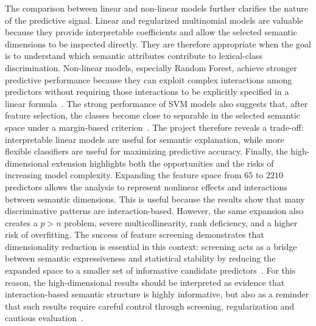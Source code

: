\documentclass{ipgpmaster}
\begin{document}
The comparison between linear and non-linear models further clarifies the nature of the predictive signal. Linear and regularized multinomial models are valuable because they provide interpretable coefficients and allow the selected semantic dimensions to be inspected directly. They are therefore appropriate when the goal is to understand which semantic attributes contribute to lexical-class discrimination. Non-linear models, especially Random Forest, achieve stronger predictive performance because they can exploit complex interactions among predictors without requiring those interactions to be explicitly specified in a linear formula~\cite{breiman2001random}. The strong performance of SVM models also suggests that, after feature selection, the classes become close to separable in the selected semantic space under a margin-based criterion~\cite{cortes1995support}. The project therefore reveals a trade-off: interpretable linear models are useful for semantic explanation, while more flexible classifiers are useful for maximizing predictive accuracy.
Finally, the high-dimensional extension highlights both the opportunities and the risks of increasing model complexity. Expanding the feature space from \(65\) to \(2210\) predictors allows the analysis to represent nonlinear effects and interactions between semantic dimensions. This is useful because the results show that many discriminative patterns are interaction-based. However, the same expansion also creates a \(p>n\) problem, severe multicollinearity, rank deficiency, and a higher risk of overfitting. The success of feature screening demonstrates that dimensionality reduction is essential in this context: screening acts as a bridge between semantic expressiveness and statistical stability by reducing the expanded space to a smaller set of informative candidate predictors~\cite{fan2008sure,fan2009ultrahigh,nandy2022covariate}. For this reason, the high-dimensional results should be interpreted as evidence that interaction-based semantic structure is highly informative, but also as a reminder that such results require careful control through screening, regularization and cautious evaluation~\cite{yu2020veridical}.
\end{document}
